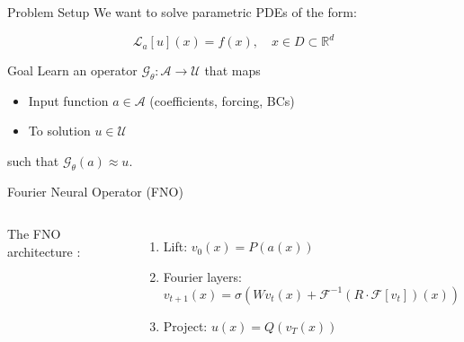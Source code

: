 \documentclass[11pt]{beamer}
\begin{document}
\begin{frame}{Problem Setup}
    We want to solve parametric PDEs of the form:

    \begin{equation}
        \mathcal{L}_a[u](x) = f(x), \quad x \in D \subset \mathbb{R}^d
        \label{eq:pde}
    \end{equation}

    \pause

    \begin{block}{Goal}
        Learn an operator $\mathcal{G}_\theta : \mathcal{A} \rightarrow \mathcal{U}$ that maps
        \begin{itemize}
            \item Input function $a \in \mathcal{A}$ (coefficients, forcing, BCs)
            \item To solution $u \in \mathcal{U}$
        \end{itemize}
        such that $\mathcal{G}_\theta(a) \approx u$.
    \end{block}
\end{frame}

\begin{frame}{Fourier Neural Operator (FNO)}
    \begin{columns}
        The FNO architecture \cite{li2020fourier}:
        \begin{enumerate}
            \item Lift: $v_0(x) = P(a(x))$
            \item Fourier layers:
            \begin{equation*}
                v_{t+1}(x) = \sigma\left(
                    W v_t(x) + \mathcal{F}^{-1}(R \cdot \mathcal{F}[v_t])(x)
                \right)
            \end{equation*}
            \item Project: $u(x) = Q(v_T(x))$
        \end{enumerate}

        \centering
    \end{columns}
\end{frame}
\end{document}
